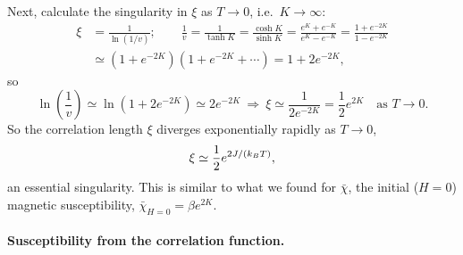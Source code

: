 Next, calculate the singularity in $\xi$ as $T\to 0$, i.e.\ $K\to\infty$:
\begin{align}
  \xi &= \frac{1}{\ln\left(1/v\right)};\qquad
  \frac{1}{v} = \frac{1}{\tanh K} = \frac{\cosh K}{\sinh K} = \frac{e^K+e^{-K}}{e^K-e^{-K}} = \frac{1+e^{-2K}}{1-e^{-2K}}\nonumber\\
  &\simeq\left(1+e^{-2K}\right)\left(1+e^{-2K}+\cdots\right) = 1+2e^{-2K},
\end{align}
so
\begin{equation}
  \ln\left(\frac{1}{v}\right)\simeq\ln\left(1+2e^{-2K}\right)\simeq 2e^{-2K}\ \Rightarrow\
  \xi\simeq\frac{1}{2e^{-2K}} = \frac{1}{2}e^{2K}\quad\text{as } T\to 0 .
\end{equation}
So the correlation length $\xi$ diverges exponentially rapidly as $T\to 0$,
\begin{equation}
  \xi\simeq\frac{1}{2}e^{2J/(k_{B} T)},
\end{equation}
an essential singularity. This is similar to what we found for $\bar\chi$, the initial ($H = 0$) magnetic susceptibility,
$\bar\chi_{H=0} = \beta e^{2K}$.

\paragraph{Susceptibility from the correlation function.}

